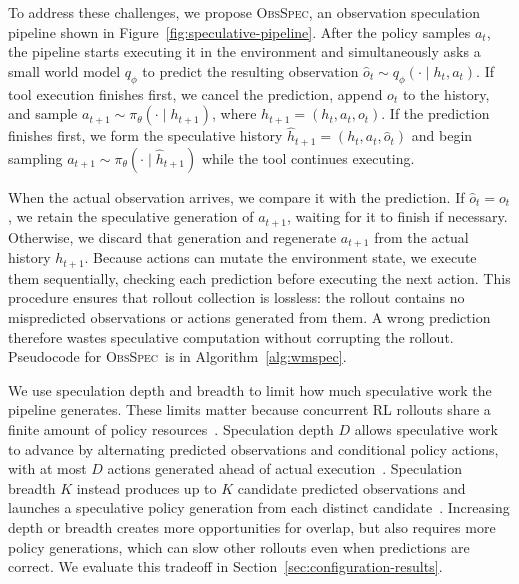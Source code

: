 \documentclass{article} %
\newcommand{\method}{\textsc{ObsSpec}}
\begin{document}
To address these challenges, we propose \method, an observation speculation pipeline shown in Figure~\ref{fig:speculative-pipeline}. After the policy samples $a_t$, the pipeline starts executing it in the environment and simultaneously asks a small world model $q_\phi$ to predict the resulting observation $\widehat{o}_t \sim q_\phi(\cdot\mid h_t,a_t)$. If tool execution finishes first, we cancel the prediction, append $o_t$ to the history, and sample $a_{t+1}\sim\pi_\theta(\cdot\mid h_{t+1})$, where $h_{t+1}=(h_t,a_t,o_t)$. If the prediction finishes first, we form the speculative history $\widehat{h}_{t+1}=(h_t,a_t,\widehat{o}_t)$ and begin sampling $a_{t+1}\sim\pi_\theta(\cdot\mid\widehat{h}_{t+1})$ while the tool continues executing.

When the actual observation arrives, we compare it with the prediction. If $\widehat{o}_t=o_t$, we retain the speculative generation of $a_{t+1}$, waiting for it to finish if necessary. Otherwise, we discard that generation and regenerate $a_{t+1}$ from the actual history $h_{t+1}$. Because actions can mutate the environment state, we execute them sequentially, checking each prediction before executing the next action. This procedure ensures that rollout collection is lossless: the rollout contains no mispredicted observations or actions generated from them. A wrong prediction therefore wastes speculative computation without corrupting the rollout. Pseudocode for \method\ is in Algorithm~\ref{alg:wmspec}.

We use speculation depth and breadth to limit how much speculative work the pipeline generates. These limits matter because concurrent RL rollouts share a finite amount of policy resources~\citep{sheng2025hybridflow,fu2026areal,piche2025pipelinerl}. Speculation depth $D$ allows speculative work to advance by alternating predicted observations and conditional policy actions, with at most $D$ actions generated ahead of actual execution~\citep{saberi2026spechop}. Speculation breadth $K$ instead produces up to $K$ candidate predicted observations and launches a speculative policy generation from each distinct candidate~\citep{ye2025speculative,li2026speculate,chen2026aospec}. Increasing depth or breadth creates more opportunities for overlap, but also requires more policy generations, which can slow other rollouts even when predictions are correct. We evaluate this tradeoff in Section~\ref{sec:configuration-results}.
\end{document}
